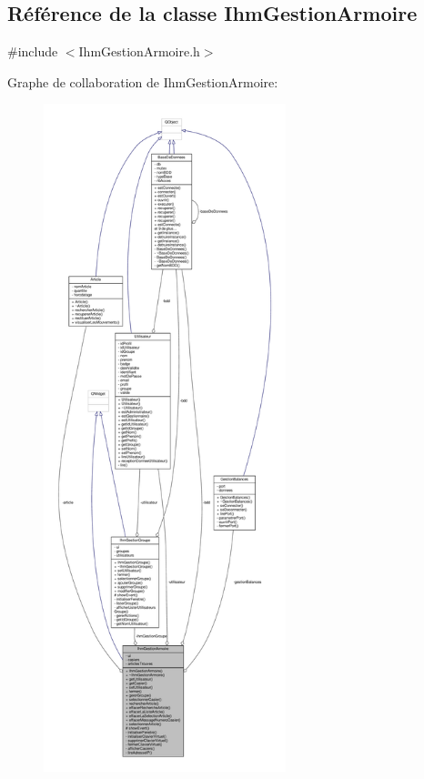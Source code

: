 \hypertarget{class_ihm_gestion_armoire}{}\subsection{Référence de la classe Ihm\+Gestion\+Armoire}
\label{class_ihm_gestion_armoire}


{\ttfamily \#include $<$Ihm\+Gestion\+Armoire.\+h$>$}



Graphe de collaboration de Ihm\+Gestion\+Armoire\+:\nopagebreak
\begin{figure}[H]
\begin{center}
\leavevmode
\includegraphics[height=550pt]{class_ihm_gestion_armoire__coll__graph}
\end{center}
\end{figure}
